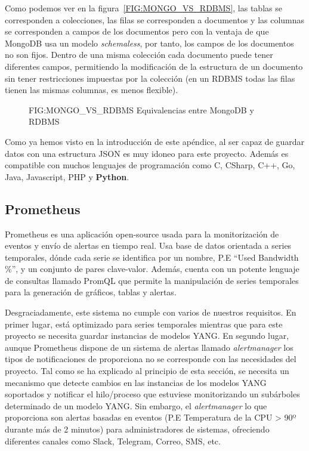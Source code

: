 Como podemos ver en la figura~\ref{FIG:MONGO_VS_RDBMS}, las tablas se corresponden a colecciones,
las filas se corresponden a documentos y las columnas se corresponden a campos de los documentos
pero con la ventaja de que MongoDB usa un modelo \textit{schemaless}, por tanto, los campos de los
documentos no son fijos. Dentro de una misma colección cada documento puede tener diferentes campos,
permitiendo la modificación de la estructura de un documento sin tener restricciones impuestas por
la colección (en un RDBMS todas las filas tienen las mismas columnas, es menos flexible). 


\begin{figure}
    [Equivalencias entre MongoDB y RDBMS]
    {FIG:MONGO_VS_RDBMS}
    {Equivalencias entre MongoDB y RDBMS}
\end{figure}

Como ya hemos visto en la introducción de este apéndice, al ser capaz de guardar datos con una
estructura \gls{JSON} es muy idoneo para este proyecto. Además es compatible con muchos lenguajes de
programación como C, CSharp, C++, Go, Java, Javascript, PHP y \textbf{Python}.
\subsection{Prometheus}
Prometheus \cite{prometheus} es una aplicación open-source usada para la monitorización de 
eventos y envío de alertas en tiempo real. Usa base de datos orientada a series temporales, 
dónde cada serie se identifica por un nombre, P.E ``Used Bandwidth \%'', y un conjunto 
de pares clave-valor. Además, cuenta con un potente lenguaje de consultas llamado PromQL que
permite la manipulación de series temporales para la generación de gráficos, tablas y alertas.

Desgraciadamente, este sistema no cumple con varios de nuestros requisitos. En primer lugar,
está optimizado para series temporales mientras que para este proyecto se necesita guardar
instancias de modelos YANG. En segundo lugar, aunque Prometheus dispone de un sistema de alertas
llamado \textit{alertmanager} los tipos de notificaciones de proporciona no se corresponde con las 
necesidades del proyecto. Tal como se ha explicado al principio de esta sección, se necesita un 
mecanismo que detecte cambios en las instancias de los modelos YANG soportados y notificar el 
hilo/proceso que estuviese monitorizando un subárboles determinado de un modelo YANG. Sin embargo,
el \textit{alertmanager} lo que proporciona son alertas basadas en eventos (P.E Temperatura de la 
CPU > 90º durante más de 2 minutos) para administradores de sistemas, ofreciendo diferentes canales
como Slack, Telegram, Correo, SMS, etc. 

